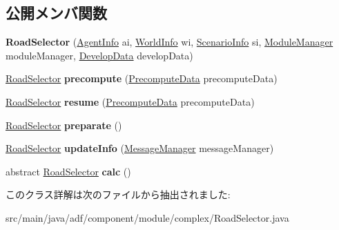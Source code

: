\subsection*{公開メンバ関数}
\begin{DoxyCompactItemize}
\item 
\hypertarget{classadf_1_1component_1_1module_1_1complex_1_1RoadSelector_af7494eba9fe7c3b0509d3b3015f94e16}{}\label{classadf_1_1component_1_1module_1_1complex_1_1RoadSelector_af7494eba9fe7c3b0509d3b3015f94e16} 
{\bfseries Road\+Selector} (\hyperlink{classadf_1_1agent_1_1info_1_1AgentInfo}{Agent\+Info} ai, \hyperlink{classadf_1_1agent_1_1info_1_1WorldInfo}{World\+Info} wi, \hyperlink{classadf_1_1agent_1_1info_1_1ScenarioInfo}{Scenario\+Info} si, \hyperlink{classadf_1_1agent_1_1module_1_1ModuleManager}{Module\+Manager} module\+Manager, \hyperlink{classadf_1_1agent_1_1develop_1_1DevelopData}{Develop\+Data} develop\+Data)
\item 
\hypertarget{classadf_1_1component_1_1module_1_1complex_1_1RoadSelector_ad696e9c2bc0de5b13f0ebf1cf982aeb2}{}\label{classadf_1_1component_1_1module_1_1complex_1_1RoadSelector_ad696e9c2bc0de5b13f0ebf1cf982aeb2} 
\hyperlink{classadf_1_1component_1_1module_1_1complex_1_1RoadSelector}{Road\+Selector} {\bfseries precompute} (\hyperlink{classadf_1_1agent_1_1precompute_1_1PrecomputeData}{Precompute\+Data} precompute\+Data)
\item 
\hypertarget{classadf_1_1component_1_1module_1_1complex_1_1RoadSelector_a714e2b434283d0f6d0cd038a49184756}{}\label{classadf_1_1component_1_1module_1_1complex_1_1RoadSelector_a714e2b434283d0f6d0cd038a49184756} 
\hyperlink{classadf_1_1component_1_1module_1_1complex_1_1RoadSelector}{Road\+Selector} {\bfseries resume} (\hyperlink{classadf_1_1agent_1_1precompute_1_1PrecomputeData}{Precompute\+Data} precompute\+Data)
\item 
\hypertarget{classadf_1_1component_1_1module_1_1complex_1_1RoadSelector_abf6fdb18762017e1ee396f2ee2bb3585}{}\label{classadf_1_1component_1_1module_1_1complex_1_1RoadSelector_abf6fdb18762017e1ee396f2ee2bb3585} 
\hyperlink{classadf_1_1component_1_1module_1_1complex_1_1RoadSelector}{Road\+Selector} {\bfseries preparate} ()
\item 
\hypertarget{classadf_1_1component_1_1module_1_1complex_1_1RoadSelector_a754df77f8029813b7130e547673b5878}{}\label{classadf_1_1component_1_1module_1_1complex_1_1RoadSelector_a754df77f8029813b7130e547673b5878} 
\hyperlink{classadf_1_1component_1_1module_1_1complex_1_1RoadSelector}{Road\+Selector} {\bfseries update\+Info} (\hyperlink{classadf_1_1agent_1_1communication_1_1MessageManager}{Message\+Manager} message\+Manager)
\item 
\hypertarget{classadf_1_1component_1_1module_1_1complex_1_1RoadSelector_aa3b43c32e1629f8db1470c3a241e6b57}{}\label{classadf_1_1component_1_1module_1_1complex_1_1RoadSelector_aa3b43c32e1629f8db1470c3a241e6b57} 
abstract \hyperlink{classadf_1_1component_1_1module_1_1complex_1_1RoadSelector}{Road\+Selector} {\bfseries calc} ()
\end{DoxyCompactItemize}


このクラス詳解は次のファイルから抽出されました\+:\begin{DoxyCompactItemize}
\item 
src/main/java/adf/component/module/complex/Road\+Selector.\+java\end{DoxyCompactItemize}

